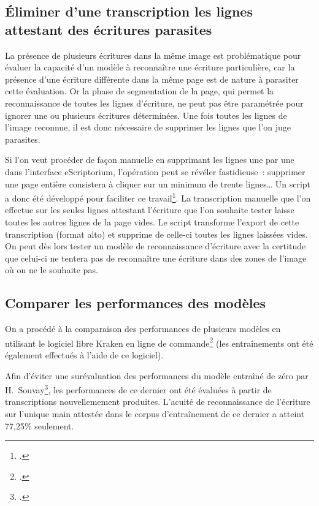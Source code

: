 \documentclass[a4paper,12pt,twoside]{book}
\begin{document}
			\subsection{Éliminer d'une transcription les lignes attestant des écritures parasites}
				La présence de plusieurs écritures dans la même image est problématique pour évaluer la capacité d'un modèle à reconnaître une écriture particulière, car la présence d'une écriture différente dans la même page est de nature à parasiter cette évaluation. Or la phase de \gls{segmentation} de la page, qui permet la reconnaissance de toutes les lignes d'écriture, ne peut pas être paramétrée pour ignorer une ou plusieurs écritures déterminées. Une fois toutes les lignes de l'image reconnue, il est donc nécessaire de supprimer les lignes que l'on juge parasites.
				
				Si l'on veut procéder de façon manuelle en supprimant les lignes une par une dans l'interface eScriptorium, l'opération peut se révéler fastidieuse~: supprimer une page entière consistera à cliquer sur un minimum de trente lignes… Un script a donc été développé pour faciliter ce travail\footcite{biaySupprLignesVidesPy2022}. La transcription manuelle que l'on effectue sur les seules lignes attestant l'écriture que l'on souhaite tester laisse toutes les autres lignes de la page vides. Le script transforme l'export de cette transcription (format \gls{alto}) et supprime de celle-ci toutes les lignes laissées vides. On peut dès lors tester un modèle de reconnaissance d'écriture avec la certitude que celui-ci ne tentera pas de reconnaître une écriture dans des zones de l'image où on ne le souhaite pas.
				
			\subsection{Comparer les performances des modèles}
				On a procédé à la comparaison des performances de plusieurs modèles en utilisant le logiciel libre Kraken en ligne de commande\footcite{KrakenDocumentation} (les entraînements ont été également effectués à l'aide de ce logiciel).
				
				Afin d'éviter une surévaluation des performances du modèle entraîné de zéro par H.~Souvay\footcite{souvayCorrespondanceConstanceSalm2021}, les performances de ce dernier ont été évaluées à partir de transcriptions nouvellemement produites. L'acuité de reconnaissance de l'écriture sur l'unique main attestée dans le corpus d'entraînement de ce dernier a atteint 77,25\% seulement. 
				
\end{document}
